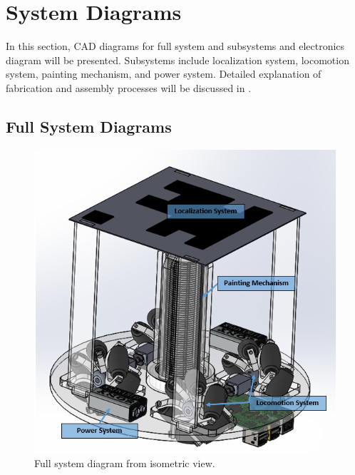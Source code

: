 
\section{System Diagrams}
\label{sec:system_diagrams}

In this section, CAD diagrams for full system and subsystems and electronics diagram will be presented. Subsystems include localization system, locomotion system, painting mechanism, and power system. Detailed explanation of fabrication and assembly processes will be discussed in .

\subsection{Full System Diagrams}
\label{sec:full_sys_diagrams}

\begin{figure}[h!]
\centering
\includegraphics[width=0.9\columnwidth]{hardware/CAD/FullSystem/Full_System.PNG}
\caption{Full system diagram from isometric view.}
\label{fig:full-sys-diagram-iso}
\end{figure}

